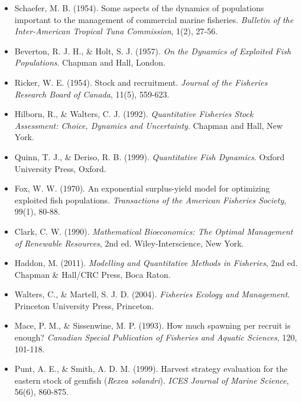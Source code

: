 \documentclass[a4paper, 11pt]{article}
\begin{document}
\begin{itemize}
\item Schaefer, M. B. (1954). Some aspects of the dynamics of populations important to
the management of commercial marine fisheries. \textit{Bulletin of the Inter-American
Tropical Tuna Commission}, 1(2), 27-56.

\item Beverton, R. J. H., \& Holt, S. J. (1957). \textit{On the Dynamics of Exploited
Fish Populations}. Chapman and Hall, London.

\item Ricker, W. E. (1954). Stock and recruitment. \textit{Journal of the Fisheries
Research Board of Canada}, 11(5), 559-623.

\item Hilborn, R., \& Walters, C. J. (1992). \textit{Quantitative Fisheries Stock
Assessment: Choice, Dynamics and Uncertainty}. Chapman and Hall, New York.

\item Quinn, T. J., \& Deriso, R. B. (1999). \textit{Quantitative Fish Dynamics}.
Oxford University Press, Oxford.

\item Fox, W. W. (1970). An exponential surplus-yield model for optimizing exploited
fish populations. \textit{Transactions of the American Fisheries Society}, 99(1), 80-88.

\item Clark, C. W. (1990). \textit{Mathematical Bioeconomics: The Optimal Management
of Renewable Resources}, 2nd ed. Wiley-Interscience, New York.

\item Haddon, M. (2011). \textit{Modelling and Quantitative Methods in Fisheries}, 2nd ed.
Chapman \& Hall/CRC Press, Boca Raton.

\item Walters, C., \& Martell, S. J. D. (2004). \textit{Fisheries Ecology and Management}.
Princeton University Press, Princeton.

\item Mace, P. M., \& Sissenwine, M. P. (1993). How much spawning per recruit is enough?
\textit{Canadian Special Publication of Fisheries and Aquatic Sciences}, 120, 101-118.

\item Punt, A. E., \& Smith, A. D. M. (1999). Harvest strategy evaluation for the
eastern stock of gemfish (\textit{Rexea solandri}). \textit{ICES Journal of Marine
Science}, 56(6), 860-875.


\end{itemize}
\end{document}
